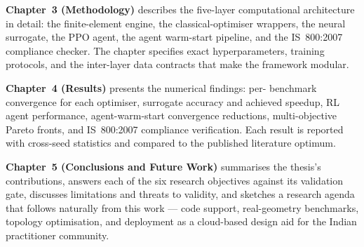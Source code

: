\textbf{Chapter~3 (Methodology)} describes the five-layer
computational architecture in detail: the finite-element engine, the
classical-optimiser wrappers, the neural surrogate, the PPO agent,
the agent warm-start pipeline, and the IS~800:2007 compliance
checker. The chapter specifies exact hyperparameters, training
protocols, and the inter-layer data contracts that make the
framework modular.

\textbf{Chapter~4 (Results)} presents the numerical findings: per-
benchmark convergence for each optimiser, surrogate accuracy and
achieved speedup, RL agent performance, agent-warm-start convergence
reductions, multi-objective Pareto fronts, and IS~800:2007
compliance verification. Each result is reported with cross-seed
statistics and compared to the published literature optimum.

\textbf{Chapter~5 (Conclusions and Future Work)} summarises the
thesis's contributions, answers each of the six research objectives
against its validation gate, discusses limitations and threats to
validity, and sketches a research agenda that follows naturally
from this work — code support, real-geometry benchmarks, topology
optimisation, and deployment as a cloud-based design aid for the
Indian practitioner community.

